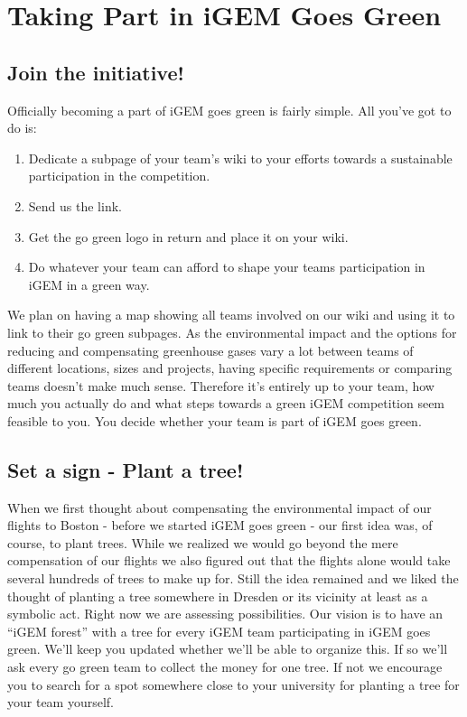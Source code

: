 
\chapter{Taking Part in iGEM Goes Green}\label{chap:takingpart}

\section{Join the initiative!}
Officially becoming a part of iGEM goes green is fairly simple. All you've got to do is:
\begin{enumerate}
	\item Dedicate a subpage of your team's wiki to your efforts towards a sustainable participation in the competition. 
	\item Send us the link.
	\item Get the go green logo in return and place it on your wiki.
	\item Do whatever your team can afford to shape your teams participation in iGEM in a green way.
\end{enumerate}
We plan on having a map showing all teams involved on our wiki and using it to link to their go green subpages. As the environmental impact and the options for reducing and compensating greenhouse gases vary a lot between teams of different locations, sizes and projects, having specific requirements or comparing teams doesn't make much sense. Therefore it's entirely up to your team, how much you actually do and what steps towards a green iGEM competition seem feasible to you. You decide whether your team is part of iGEM goes green.


\section{Set a sign - Plant a tree!}\label{sec:trees}

When we first thought about compensating the environmental impact of our flights to Boston - before we started iGEM goes green - our first idea was, of course, to plant trees. While we realized we would go beyond the mere compensation of our flights we also figured out that the flights alone would take several hundreds of trees to make up for. Still the idea remained and we liked the thought of planting a tree somewhere in Dresden or its vicinity at least as a symbolic act. Right now we are assessing possibilities. Our vision is to have an ``iGEM forest'' with a tree for every iGEM team participating in iGEM goes green. We'll keep you updated whether we'll be able to organize this. If so we'll ask every go green team to collect the money for one tree. If not we encourage you to search for a spot somewhere close to your university for planting a tree for your team yourself.

